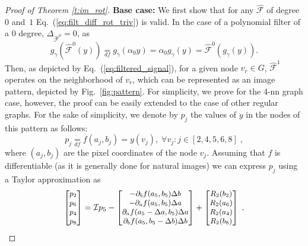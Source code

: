 \documentclass[10pt,journal,compsoc]{IEEEtran}
\newcommand{\df}{\mathop{=}\limits_{df}}
\newcommand{\hmF}{\hat{\mathcal{F}}}
\begin{document}
\begin{proof}[Proof of Theorem \ref{t:im_rot}]
		\textbf{Base case:} We first show that for any $\hmF$ of degree $0$ and~$1$ Eq.~(\ref{eq:filt_diff_rot_triv}) is valid. In the case of a polynomial filter of a $0$ degree, $\Delta_{\hmF^0}  = 0$, as
		\begin{equation}
		g_\gamma\left(\hmF^0 (y)\right) \df g_\gamma(\alpha_0 y) = \alpha_0 g_\gamma(y) = \hmF^0 (g_\gamma(y)).
		\label{eq:filt_diff_rot_zero_deg}
		\end{equation}
		\noindent
		Then, as depicted by Eq.~(\ref{eq:filtered_signal}), for a given node $v_r \in G$, $\hmF^1$ operates on the neighborhood of $v_r$, which can be represented as an image pattern, depicted by Fig.~\ref{fig:pattern}. For simplicity, we prove for the 4-nn graph case, however, the proof can be easily extended to the case of other regular graphs.
		For the sake of simplicity, we denote by $p_j$ the values of $y$ in the nodes of this pattern as follows:
		\begin{equation}
		p_j \df f(a_j,b_j) = y(v_j), \; \forall v_j: j \in [2,4,5,6,8] \;,
		\end{equation}
		\noindent
		where $(a_j, b_j)$ are the pixel coordinates of the node $v_j$. Assuming that $f$ is differentiable (as it is generally done for natural images) we can express $p_j$ using a Taylor approximation as
		\begin{equation}
		\small
		\begin{bmatrix}
		p_2 \\ p_6 \\ p_4 \\ p_8 \\
		\end{bmatrix} =
		\mathcal{I} p_5 -
		\begin{bmatrix}
		- \partial_b f(a_5, b_5) \Delta b \\
		- \partial_a f(a_5, b_5) \Delta a \\
		\partial_a f(a_5 - \Delta a, b_5) \Delta a\\
		\partial_b f(a_5, b_5- \Delta b)  \Delta b\\
		\end{bmatrix} +
		\begin{bmatrix}
		R_2(b_2) \\ R_2(a_6) \\ R_2(a_4) \\ R_2(b_8) \\
		\end{bmatrix} \;,
		\label{eq:points_o}
		\end{equation}

\end{proof}
\end{document}
